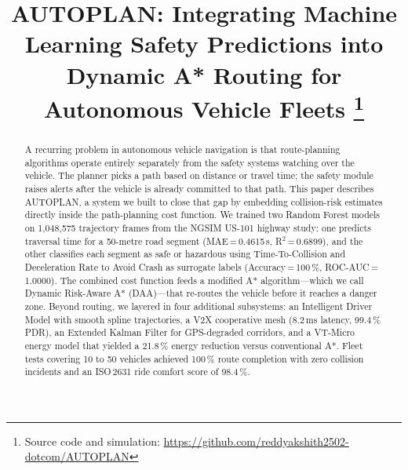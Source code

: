 \documentclass[conference]{IEEEtran}
\begin{document}
\title{AUTOPLAN: Integrating Machine Learning Safety Predictions into
Dynamic A* Routing for Autonomous Vehicle Fleets%
\thanks{Source code and simulation:
\url{https://github.com/reddyakshith2502-dotcom/AUTOPLAN}}}

\author{
  \and
  \and
}

\maketitle

\begin{abstract}
A recurring problem in autonomous vehicle navigation is that route-planning
algorithms operate entirely separately from the safety systems watching over
the vehicle. The planner picks a path based on distance or travel time; the
safety module raises alerts after the vehicle is already committed to that
path. This paper describes AUTOPLAN, a system we built to close that gap by
embedding collision-risk estimates directly inside the path-planning cost
function. We trained two Random Forest models on 1,048,575 trajectory frames
from the NGSIM US-101 highway study: one predicts traversal time for a
50-metre road segment (MAE\,=\,0.4615\,s, R$^2$\,=\,0.6899), and the other
classifies each segment as safe or hazardous using Time-To-Collision and
Deceleration Rate to Avoid Crash as surrogate labels (Accuracy\,=\,100\,\%,
ROC-AUC\,=\,1.0000). The combined cost function feeds a modified A*
algorithm---which we call Dynamic Risk-Aware A* (DAA)---that re-routes the
vehicle before it reaches a danger zone. Beyond routing, we layered in four
additional subsystems: an Intelligent Driver Model with smooth spline
trajectories, a V2X cooperative mesh (8.2\,ms latency, 99.4\,\% PDR), an
Extended Kalman Filter for GPS-degraded corridors, and a VT-Micro energy
model that yielded a 21.8\,\% energy reduction versus conventional A*. Fleet
tests covering 10 to 50 vehicles achieved 100\,\% route completion with zero
collision incidents and an ISO\,2631 ride comfort score of 98.4\,\%.
\end{abstract}
\end{document}
